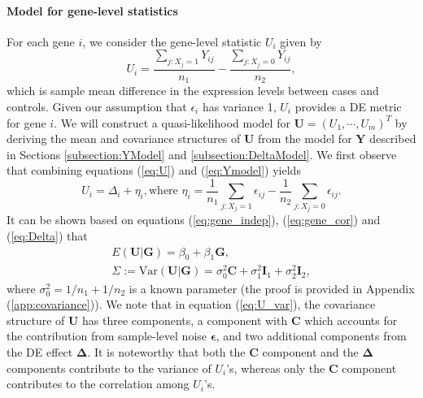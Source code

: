 	\paragraph{Model for gene-level statistics}\label{subsection:UModel}
	For each gene $i$, we consider the gene-level statistic $U_i$ given by 
	\begin{equation}
	\label{eq:U}
	U_i = \dfrac{\sum_{j: X_j=1}Y_{ij}}{n_1} - \dfrac{\sum_{j: X_j=0}Y_{ij}}{n_2},
	\end{equation}
	which is sample mean difference in the expression levels between cases and controls. Given our
	assumption that $\epsilon_i$ has variance 1, $U_i$ provides a DE metric for gene $i$. We will
	construct a quasi-likelihood model for $\bm U=(U_1,\cdots,U_m)^T$ by deriving the mean and
	covariance structures of $\bm U$ from the model for $\bm Y$ described in Sections
	\ref{subsection:YModel} and \ref{subsection:DeltaModel}. We first observe that combining 
	equations
	(\ref{eq:U}) and (\ref{eq:Ymodel}) yields
	\begin{equation} 
	U_i = \Delta_i + \eta_i, \text{where } \eta_i = \dfrac{1}{n_1}\sum_{j: X_j=1}\epsilon_{ij}-
	\dfrac{1}{n_2}\sum_{j: X_j=0}\epsilon_{ij}.
	\end{equation}
	It can be shown based on equations (\ref{eq:gene_indep}), (\ref{eq:gene_cor}) and 
	(\ref{eq:Delta})
	that
	\begin{gather}
	E(\bm U|\bm G) = \beta_0+\beta_1 \bm G,\label{eq:U_mean}\\
	\Sigma:=\mbox{Var}(\bm U|\bm G) = \sigma_0^2\bm C + \sigma_1^2\bm I_1+\sigma_2^2\bm
	I_2,\label{eq:U_var}
	\end{gather}
	where $\sigma_0^2=1/n_1+1/n_2$ is a known parameter (the proof is provided in Appendix 
	(\ref{app:covariance})). We note that in equation (\ref{eq:U_var}), 
	the
	covariance structure of $\bm U$ has three components, a component with $\bm C$ which accounts 
	for
	the contribution from sample-level noise $\bm \epsilon$, and two additional components from the 
	DE
	effect $\bm \Delta$. It is noteworthy that both the $\bm C$ component and the $\bm \Delta$
	components contribute to the variance of $U_i$'s, whereas only the $\bm C$ component 
	contributes to
	the correlation among $U_i$'s.
	
